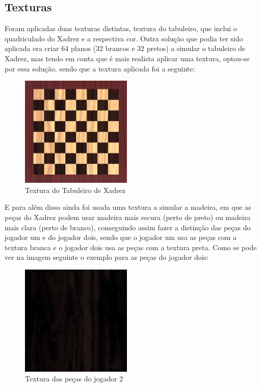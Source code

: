 \documentclass[portugues,final]{revdetua}
\begin{document}
\subsection{Texturas}

Foram aplicadas duas texturas distintas, textura do tabuleiro, que inclui o quadriculado do Xadrez e a respectiva cor.
Outra solução que podia ter sido aplicada era criar 64 planos (32 brancos e 32 pretos) a simular o tabuleiro de Xadrez, mas tendo em conta que é mais realista aplicar uma textura, optou-se por essa solução, sendo que a textura aplicada foi a seguinte:

\begin{figure}[H]
\centerline{\includegraphics[width=150pt]{images/chessboard.png}}
\caption{Textura do Tabuleiro de Xadrez}
\label{img:complete}
\end{figure}

E para além disso ainda foi usada uma textura a simular a madeira, em que as peças do Xadrez podem usar madeira mais escura (perto de preto) ou madeira mais clara (perto de branco), conseguindo assim fazer a distinção das peças do jogador um e do jogador dois, sendo que o jogador um usa as peças com a textura branca e o jogador dois usa as peças com a textura preta. Como se pode ver na imagem seguinte o exemplo para as peças do jogador dois:

\begin{figure}[H]
\centerline{\includegraphics[width=150pt]{images/basic_black.png}}
\caption{Textura das peças do jogador 2}
\label{img:complete}
\end{figure}
\end{document}
